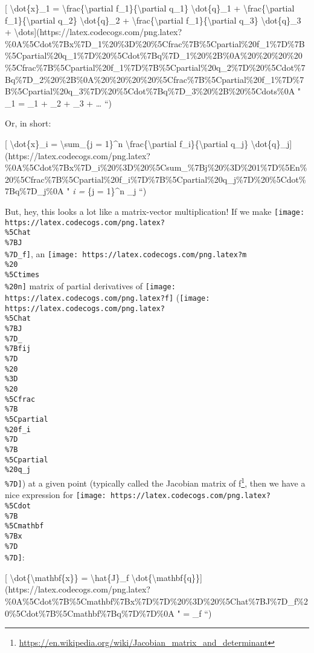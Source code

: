 \documentclass[]{article}
\renewcommand{\href}[2]{#2\footnote{\url{#1}}}
\begin{document}
{[} \textbackslash{}dot\{x\}\_1 = \textbackslash{}frac\{\textbackslash{}partial
f\_1\}\{\textbackslash{}partial q\_1\} \textbackslash{}dot\{q\}\_1 +
\textbackslash{}frac\{\textbackslash{}partial f\_1\}\{\textbackslash{}partial
q\_2\} \textbackslash{}dot\{q\}\_2 +
\textbackslash{}frac\{\textbackslash{}partial f\_1\}\{\textbackslash{}partial
q\_3\} \textbackslash{}dot\{q\}\_3 +
\textbackslash{}dots{]}(https://latex.codecogs.com/png.latex?\%0A\%5Cdot\%7Bx\%7D\_1\%20\%3D\%20\%5Cfrac\%7B\%5Cpartial\%20f\_1\%7D\%7B\%5Cpartial\%20q\_1\%7D\%20\%5Cdot\%7Bq\%7D\_1\%20\%2B\%0A\%20\%20\%20\%20\%5Cfrac\%7B\%5Cpartial\%20f\_1\%7D\%7B\%5Cpartial\%20q\_2\%7D\%20\%5Cdot\%7Bq\%7D\_2\%20\%2B\%0A\%20\%20\%20\%20\%5Cfrac\%7B\%5Cpartial\%20f\_1\%7D\%7B\%5Cpartial\%20q\_3\%7D\%20\%5Cdot\%7Bq\%7D\_3\%20\%2B\%20\%5Cdots\%0A
" \_1 =  \_1 +
 \_2 + 
\_3 + \dots
``)

Or, in short:

{[} \textbackslash{}dot\{x\}\_i = \textbackslash{}sum\_\{j = 1\}\^{}n
\textbackslash{}frac\{\textbackslash{}partial f\_i\}\{\textbackslash{}partial
q\_j\}
\textbackslash{}dot\{q\}\_j{]}(https://latex.codecogs.com/png.latex?\%0A\%5Cdot\%7Bx\%7D\_i\%20\%3D\%20\%5Csum\_\%7Bj\%20\%3D\%201\%7D\%5En\%20\%5Cfrac\%7B\%5Cpartial\%20f\_i\%7D\%7B\%5Cpartial\%20q\_j\%7D\%20\%5Cdot\%7Bq\%7D\_j\%0A
" \emph{i = \sum}\{j = 1\}\^{}n 
\_j ``)

But, hey, this looks a lot like a matrix-vector multiplication! If we make
\texttt{[image: https://latex.codecogs.com/png.latex?\\\%5Chat\\\%7BJ\\\%7D\_f]}, an
\texttt{[image: https://latex.codecogs.com/png.latex?m\\\%20\\\%5Ctimes\\\%20n]}
matrix of partial derivatives of
\texttt{[image: https://latex.codecogs.com/png.latex?f]}
(\texttt{[image: https://latex.codecogs.com/png.latex?\\\%5Chat\\\%7BJ\\\%7D\_\\\%7Bfij\\\%7D\\\%20\\\%3D\\\%20\\\%5Cfrac\\\%7B\\\%5Cpartial\\\%20f\_i\\\%7D\\\%7B\\\%5Cpartial\\\%20q\_j\\\%7D]})
at a given point (typically called the
\href{https://en.wikipedia.org/wiki/Jacobian_matrix_and_determinant}{Jacobian
matrix of f}, then we have a nice expression for
\texttt{[image: https://latex.codecogs.com/png.latex?\\\%5Cdot\\\%7B\\\%5Cmathbf\\\%7Bx\\\%7D\\\%7D]}:

{[} \textbackslash{}dot\{\textbackslash{}mathbf\{x\}\} =
\textbackslash{}hat\{J\}\_f
\textbackslash{}dot\{\textbackslash{}mathbf\{q\}\}{]}(https://latex.codecogs.com/png.latex?\%0A\%5Cdot\%7B\%5Cmathbf\%7Bx\%7D\%7D\%20\%3D\%20\%5Chat\%7BJ\%7D\_f\%20\%5Cdot\%7B\%5Cmathbf\%7Bq\%7D\%7D\%0A
"  = \_f  ``)
\end{document}
